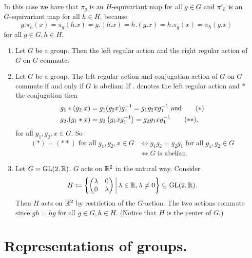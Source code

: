 \begin{rem}
  In this case we have that $\pi_g$ is an $H$-equivariant map for all $g \in G$ and $\pi'_h$ is an $G$-equivariant map for all $h \in H$, because
  \[
    g.\pi_h(x) = \pi_g(h.x) = g.(h.x) = h.(g.x) = h.\pi_g(x) = \pi_h(g.x)
  \]
  for all $g \in G, h \in H$.
\end{rem}


\begin{expls}
  \begin{enumerate}[label=\emph{\alph*)},leftmargin=*]
    \item
      Let $G$ be a group. Then the left regular action and the right regular action of $G$ on $G$ commute.
    \item
      Let $G$ be a group. The left regular action and conjugation action of $G$ on $G$ commute if and only if $G$ is abelian: If $.$ denotes the left regular action and $*$ the conjugation then
      \begin{align*}
        g_1*(g_2.x) &= g_1 (g_2 x) g_1^{-1} = g_1 g_2 x g_1^{-1} \text{ and} \tag{\ensuremath{\ast}}\\
        g_2.(g_1*x) &= g_2 \left(g_1 x g_1^{-1}\right) = g_2 g_1 x g_1^{-1} \tag{\ensuremath{\ast\ast}},
      \end{align*}
      for all $g_1, g_2, x \in G$. So
      \begin{align*}
        (\ast) = (\ast\ast) \text{ for all } g_1, g_2, x \in G
        &\Leftrightarrow g_1 g_2 = g_2 g_1 \text{ for all } g_1, g_2 \in G \\
        &\Leftrightarrow \text{$G$ is abelian}.
      \end{align*}
    \item
      Let $G = \operatorname{GL}(2,\mathbb{R})$. $G$ acts on $\mathbb{R}^2$ in the natural way. Consider
      \[
        H \coloneqq \left\{ \begin{pmatrix}\lambda&0\\0&\lambda\end{pmatrix} \,\middle|\, \lambda \in \mathbb{R}, \lambda \neq 0 \right\} \subseteq \operatorname{GL}(2,\mathbb{R}).
      \]
      Then $H$ acts on $\mathbb{R}^2$ by restriction of the $G$-action. The two actions commute since $gh = hg$ for all $g \in G, h \in H$. (Notice that $H$ is the center of $G$.)
  \end{enumerate}
\end{expls}





\section{Representations of groups.}


